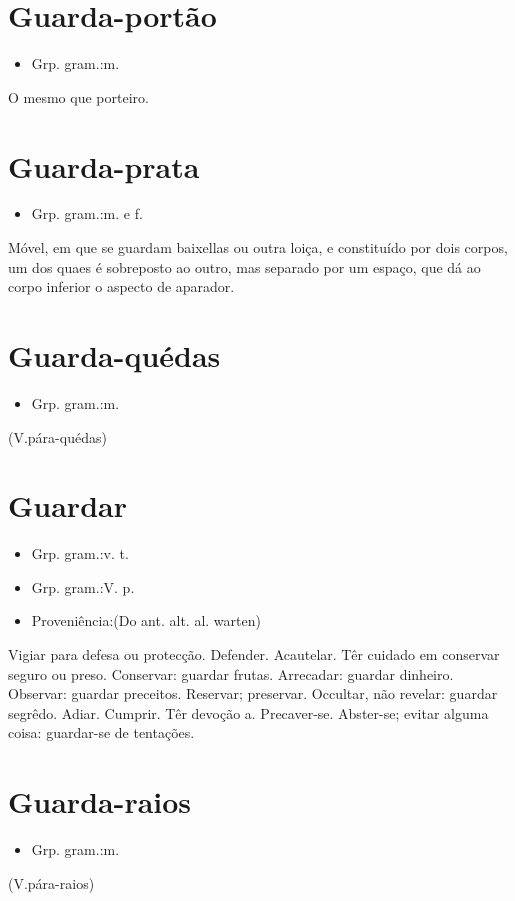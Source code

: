 \section{Guarda-portão}
\begin{itemize}
\item {Grp. gram.:m.}
\end{itemize}
O mesmo que \textunderscore porteiro\textunderscore .
\section{Guarda-prata}
\begin{itemize}
\item {Grp. gram.:m.  e  f.}
\end{itemize}
Móvel, em que se guardam baixellas ou outra loiça, e constituído por dois corpos, um dos quaes é sobreposto ao outro, mas separado por um espaço, que dá ao corpo inferior o aspecto de aparador.
\section{Guarda-quédas}
\begin{itemize}
\item {Grp. gram.:m.}
\end{itemize}
(V.pára-quédas)
\section{Guardar}
\begin{itemize}
\item {Grp. gram.:v. t.}
\end{itemize}
\begin{itemize}
\item {Grp. gram.:V. p.}
\end{itemize}
\begin{itemize}
\item {Proveniência:(Do ant. alt. al. \textunderscore warten\textunderscore )}
\end{itemize}
Vigiar para defesa ou protecção.
Defender.
Acautelar.
Têr cuidado em conservar seguro ou preso.
Conservar: \textunderscore guardar frutas\textunderscore .
Arrecadar: \textunderscore guardar dinheiro\textunderscore .
Observar: \textunderscore guardar preceitos\textunderscore .
Reservar; preservar.
Occultar, não revelar: \textunderscore guardar segrêdo\textunderscore .
Adiar.
Cumprir.
Têr devoção a.
Precaver-se.
Abster-se; evitar alguma coisa: \textunderscore guardar-se de tentações\textunderscore .
\section{Guarda-raios}
\begin{itemize}
\item {Grp. gram.:m.}
\end{itemize}
(V.pára-raios)
